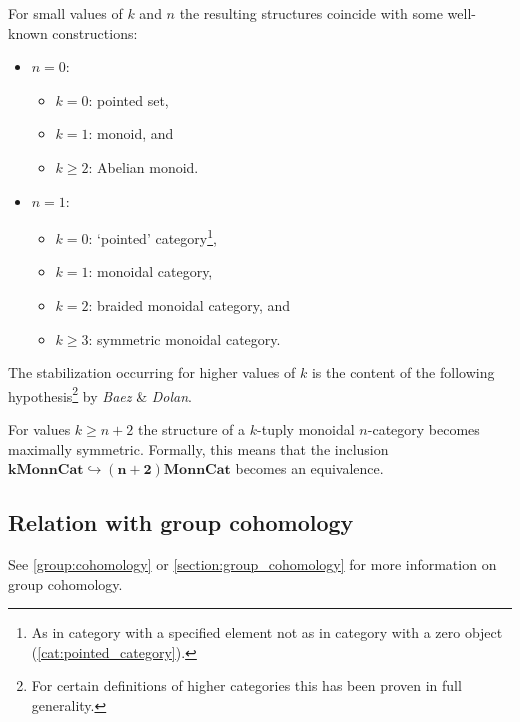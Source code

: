     \begin{example}
        For small values of $k$ and $n$ the resulting structures coincide with some well-known constructions:
        \begin{itemize}
            \item $n=0$:
                \begin{itemize}
                    \item $k=0$: pointed set,
                    \item $k=1$: monoid, and
                    \item $k\geq2$: Abelian monoid.
                \end{itemize}
            \item $n=1$:
                \begin{itemize}
                    \item $k=0$: `pointed' category\footnote{As in category with a specified element not as in category with a zero object (\cref{cat:pointed_category}).},
                    \item $k=1$: monoidal category,
                    \item $k=2$: braided monoidal category, and
                    \item $k\geq3$: symmetric monoidal category.
                \end{itemize}
        \end{itemize}
    \end{example}
    The stabilization occurring for higher values of $k$ is the content of the following hypothesis\footnote{For certain definitions of higher categories this has been proven in full generality.} by \textit{Baez} \& \textit{Dolan}.
    \begin{theorem}
        For values $k\geq n+2$ the structure of a $k$-tuply monoidal $n$-category becomes maximally symmetric. Formally, this means that the inclusion \emph{$\symbf{k}\mathbf{Mon}\symbf{n}\mathbf{Cat}\hookrightarrow\symbf{(n+2)}\mathbf{Mon}\symbf{n}\mathbf{Cat}$} becomes an equivalence.
    \end{theorem}

\subsection{Relation with group cohomology}\label{section:hda_group_cohomology}

    See \cref{group:cohomology} or \cref{section:group_cohomology} for more information on group cohomology.

